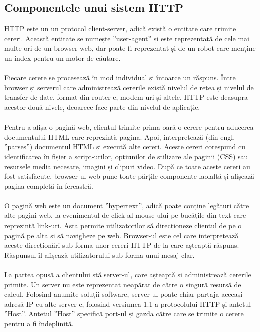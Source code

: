 \subsection{Componentele unui sistem HTTP}
HTTP este un un protocol client-server, adică există o entitate care trimite cereri. Această entitate se numește ”user-agent” și este reprezentată de cele mai multe ori de un browser web, dar poate fi reprezentat și de un robot care menține un index pentru un motor de căutare.
\\ \\
Fiecare cerere se procesează în mod individual și întoarce un răspuns. Între browser și serverul care administrează cererile există nivelul de rețea și nivelul de transfer de date, format din router-e, modem-uri și altele. HTTP este deasupra acestor două nivele, deoarece face parte din nivelul de aplicație.
\\ \\
Pentru a afișa o pagină web, clientul trimite prima oară o cerere pentru aducerea documentului HTML care reprezintă pagina. Apoi, interpretează (din engl. ”parses”) documentul HTML și execută alte cereri. Aceste cereri corespund cu identificarea în fișier a script-urilor, opțiunilor de stilizare ale paginii (CSS) sau resursele media necesare, imagini și clipuri video. După ce toate aceste cereri au fost satisfăcute, browser-ul web pune toate părțile componente laolaltă și afișează pagina completă în fereastră.
\\ \\
O pagină web este un document ”hypertext”, adică poate conține legături către alte pagini web, la evenimentul de click al mouse-ului pe bucățile din text care reprezintă link-uri. Asta permite utilizatorilor să direcționeze clientul de pe o pagină pe alta și să navigheze pe web. Browser-ul este cel care interpretează aceste direcționări sub forma unor cereri HTTP de la care așteaptă răspuns. Răspunsul îl afișează utilizatorului sub forma unui mesaj clar.
\\ \\
La partea opusă a clientului stă server-ul, care așteaptă și administrează cererile primite. Un server nu este reprezentat neapărat de către o singură resursă de calcul. Folosind anumite soluții software, server-ul poate chiar partaja aceeași adresă IP cu alte server-e, folosind versiunea 1.1 a protocolului HTTP și antetul ”Host”. Antetul ”Host” specifică port-ul și gazda către care se trimite o cerere pentru a fi îndeplinită.

